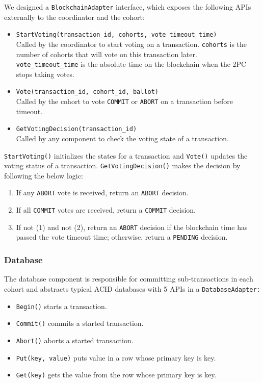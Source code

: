 \documentclass[11pt,sigplan,screen,nonacm]{acmart}
\begin{document}
We designed a \texttt{BlockchainAdapter} interface, which exposes the following APIs externally to the coordinator and the cohort:
\begin{itemize}
  \item \texttt{StartVoting(transaction\_id, cohorts, vote\_timeout\_time)}\\Called by the coordinator to start voting on a transaction. \texttt{cohorts} is the number of cohorts that will vote on this transaction later.\\\texttt{vote\_timeout\_time} is the absolute time on the blockchain when the 2PC stops taking votes.
  \item \texttt{Vote(transaction\_id, cohort\_id, ballot)}\\Called by the cohort to vote \texttt{COMMIT} or \texttt{ABORT} on a transaction before timeout.
  \item \texttt{GetVotingDecision(transaction\_id)}\\Called by any component to check the voting state of a transaction.
\end{itemize}

\texttt{StartVoting()} initializes the states for a transaction and \texttt{Vote()} updates the voting status of a transaction. \texttt{GetVotingDecision()} makes the decision by following the below logic:
\begin{enumerate}
  \item If any \texttt{ABORT} vote is received, return an \texttt{ABORT} decision.
  \item If all \texttt{COMMIT} votes are received, return a \texttt{COMMIT} decision.
  \item If not (1) and not (2), return an \texttt{ABORT} decision if the blockchain time has passed the vote timeout time; otherwise, return a \texttt{PENDING} decision.
\end{enumerate}

\subsubsection{Database} \label{database}
The database component is responsible for committing sub-transactions in each cohort and abstracts typical ACID databases with 5 APIs in a \texttt{DatabaseAdapter:} 
\begin{itemize}
  \item \texttt{Begin()} starts a transaction.
  \item \texttt{Commit()} commits a started transaction.
  \item \texttt{Abort()} aborts a started transaction.
  \item \texttt{Put(key, value)} puts value in a row whose primary key is key.
  \item \texttt{Get(key)} gets the value from the row whose primary key is key.
\end{itemize}
\end{document}
